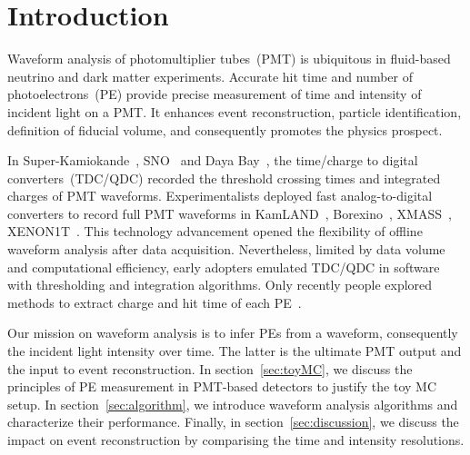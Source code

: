 \section{Introduction}
\label{sec:introduction}

Waveform analysis of photomultiplier tubes~(PMT) is ubiquitous in fluid-based neutrino and dark matter experiments. Accurate hit time and number of photoelectrons~(PE) provide precise measurement of time and intensity of incident light on a PMT. It enhances event reconstruction, particle identification, definition of fiducial volume, and consequently promotes the physics prospect.

In Super-Kamiokande~\cite{noauthor_super-kamiokande_2003}, SNO~\cite{dunger_event_2019} and Daya Bay~\cite{daya_bay_collaboration_measurement_2017}, the time/charge to digital converters~(TDC/QDC) recorded the threshold crossing times and integrated charges of PMT waveforms.  Experimentalists deployed fast analog-to-digital converters to record full PMT waveforms in KamLAND~\cite{kamland_collaboration_production_2010}, Borexino~\cite{alimonti_borexino_2009}, XMASS~\cite{abe_xmass_2013}, XENON1T~\cite{xenon_collaboration_xenon1t_2019}.  This technology advancement opened the flexibility of offline waveform analysis after data acquisition.  Nevertheless, limited by data volume and computational efficiency, early adopters emulated TDC/QDC in software with thresholding and integration algorithms.  Only recently people explored methods to extract charge and hit time of each PE~\cite{zhang_comparison_2019}.

Our mission on waveform analysis is to infer PEs from a waveform, consequently the incident light intensity over time.  The latter is the ultimate PMT output and the input to event reconstruction.  In section~\ref{sec:toyMC}, we discuss the principles of PE measurement in PMT-based detectors to justify the toy MC setup.  In section~\ref{sec:algorithm}, we introduce waveform analysis algorithms and characterize their performance.  Finally, in section~\ref{sec:discussion}, we discuss the impact on event reconstruction by comparising the time and intensity resolutions.
